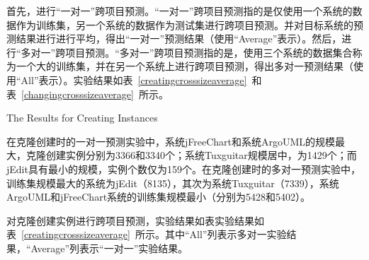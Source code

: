 首先，进行“一对一”跨项目预测。“一对一”跨项目预测指的是仅使用一个系统的数据作为训练集，另一个系统的数据作为测试集进行跨项目预测。并对目标系统的预测结果进行进行平均，得出“一对一”预测结果（使用“Average”表示）。然后，进行“多对一”跨项目预测。“多对一”跨项目预测指的是，使用三个系统的数据集合称为一个大的训练集，并在另一个系统上进行跨项目预测，得出多对一预测结果（使用“All”表示）。实验结果如表~\ref{creatingcrosssizeaverage}~和表~\ref{changingcrosssizeaverage}~所示。

{The Results for Creating Instances}

在克隆创建时的一对一预测实验中，系统jFreeChart和系统ArgoUML的规模最大，克隆创建实例分别为3366和3340个；系统Tuxguitar规模居中，为1429个；而jEdit具有最小的规模，实例个数仅为159个。在克隆创建时的多对一预测实验中，训练集规模最大的系统为jEdit（8135），其次为系统Tuxguitar（7339），系统ArgoUML和jFreeChart系统的训练集规模最小（分别为5428和5402）。

对克隆创建实例进行跨项目预测，实验结果如表实验结果如表~\ref{creatingcrosssizeaverage}~所示。其中“All”列表示多对一实验结果，“Average”列表示“一对一”实验结果。

